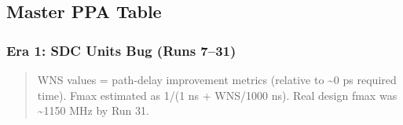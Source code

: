 \subsection{Master PPA Table}\label{cr:run:asap7-cpu:master-ppa-table}

\subsubsection{Era 1: SDC Units Bug (Runs 7--31)}\label{cr:run:asap7-cpu:era-1-sdc-units-bug-runs-731}

\begin{record}

\begin{quote}
WNS values = path-delay improvement metrics (relative to
\textasciitilde0 ps required time). Fmax estimated as 1/(1 ns +
\textbar WNS\textbar/\allowbreak{}1000 ns). Real design fmax was
\textasciitilde1150 MHz by Run 31.
\end{quote}

\begin{landscape}
\small\setlength{\tabcolsep}{4pt}


\end{landscape}
\end{record}
